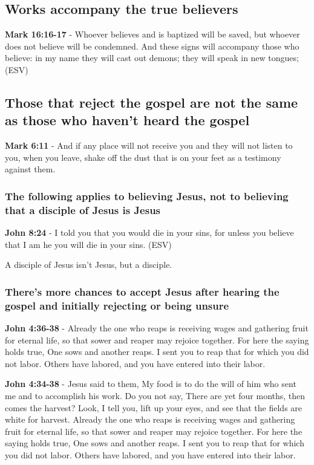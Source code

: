 \documentclass[11pt]{article}
\begin{document}
\subsection{Works accompany the true believers}
\label{sec:orgc71a917}
\textbf{Mark 16:16-17} - Whoever believes and is baptized will be saved, but whoever does not believe will be condemned. And these signs will accompany those who believe: in my name they will cast out demons; they will speak in new tongues; (ESV)

\subsection{Those that reject the gospel are not the same as those who haven't heard the gospel}
\label{sec:org774dfcc}
\textbf{Mark 6:11} - And if any place will not receive you and they will not listen to you, when you leave, shake off the dust that is on your feet as a testimony against them.

\subsubsection{The following applies to believing Jesus, not to believing that a disciple of Jesus is Jesus}
\label{sec:orgb6c3977}
\textbf{John 8:24} - I told you that you would die in your sins, for unless you believe that I am he you will die in your sins.  (ESV)

A disciple of Jesus isn't Jesus, but a disciple.

\subsubsection{There's more chances to accept Jesus after hearing the gospel and initially rejecting or being unsure}
\label{sec:orgf93b4ca}

\textbf{John 4:36-38} - Already the one who reaps is receiving wages and gathering fruit for eternal life, so that sower and reaper may rejoice together. For here the saying holds true, One sows and another reaps. I sent you to reap that for which you did not labor. Others have labored, and you have entered into their labor.

\textbf{John 4:34-38} - Jesus said to them, My food is to do the will of him who sent me and to accomplish his work. Do you not say, There are yet four months, then comes the harvest? Look, I tell you, lift up your eyes, and see that the fields are white for harvest. Already the one who reaps is receiving wages and gathering fruit for eternal life, so that sower and reaper may rejoice together. For here the saying holds true, One sows and another reaps. I sent you to reap that for which you did not labor. Others have labored, and you have entered into their labor.
\end{document}
